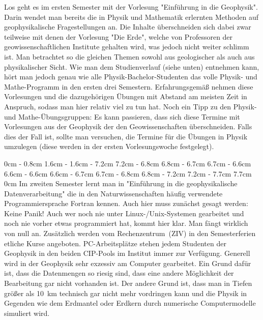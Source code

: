 \begin{multicols}{2}
Los geht es im ersten Semester mit der Vorlesung "Einführung in die Geophysik". Darin wendet man bereits die in Physik und Mathematik erlernten Methoden auf geophysikalische Fragestellungen an. Die Inhalte überschneiden sich dabei zwar teilweise mit denen der Vorlesung "Die Erde", welche von Professoren der geowissenschaftlichen Institute gehalten wird, was jedoch nicht weiter schlimm ist. Man betrachtet so die gleichen Themen sowohl aus geologischer als auch aus physikalischer Sicht. Wie man dem Studienverlauf (siehe unten) entnehmen kann, hört man jedoch genau wie alle Physik-Bachelor-Studenten das volle Physik- und Mathe-Programm in den ersten drei Semestern. Erfahrungsgemäß nehmen diese Vorlesungen und die dazugehörigen Übungen mit Abstand am meisten Zeit in Anspruch, sodass man hier relativ viel zu tun hat. Noch ein Tipp zu den Physik- und Mathe-Übungsgruppen: Es kann passieren, dass sich diese Termine mit Vorlesungen aus der Geophysik der den Geowissenschaften überschneiden. Falls dies der Fall ist, sollte man versuchen, die Termine für die Übungen in Physik umzulegen (diese werden in der ersten Vorlesungswoche festgelegt).

0cm \columnwidth
0cm \columnwidth
0cm \columnwidth
0cm \columnwidth
0cm \columnwidth
0cm \columnwidth
0cm \columnwidth
0cm \columnwidth
0cm \columnwidth
0cm \columnwidth
0cm \columnwidth
0cm \columnwidth
0cm \columnwidth
0.8cm \dimexpr\columnwidth - 0.8cm
1.6cm \dimexpr\columnwidth - 1.6cm
\dimexpr\columnwidth - 7.2cm 7.2cm
\dimexpr\columnwidth - 6.8cm 6.8cm
\dimexpr\columnwidth - 6.7cm 6.7cm
\dimexpr\columnwidth - 6.6cm 6.6cm
\dimexpr\columnwidth - 6.6cm 6.6cm
\dimexpr\columnwidth - 6.7cm 6.7cm
\dimexpr\columnwidth - 6.8cm 6.8cm
\dimexpr\columnwidth - 7.2cm 7.2cm
\dimexpr\columnwidth - 7.7cm 7.7cm
0cm \columnwidth
Im zweiten Semester lernt man in "Einführung in die geophysikalische Datenverarbeitung" die in den Naturwissenschaften häufig verwendete Programmiersprache Fortran kennen. Auch hier muss zunächst gesagt werden: Keine Panik! Auch wer noch nie unter Linux-/Unix-Systemen gearbeitet und noch nie vorher etwas programmiert hat, kommt hier klar. Man fängt wirklich von null an. Zusätzlich werden vom Rechenzentrum~(ZIV) in den Semesterferien etliche Kurse angeboten. PC-Arbeitsplätze stehen jedem Studenten der Geophysik in den beiden CIP-Pools im Institut immer zur Verfügung. Generell wird in der Geophysik sehr exzessiv am Computer gearbeitet. Ein Grund dafür ist, dass die Datenmengen so riesig sind, dass eine andere Möglichkeit der Bearbeitung gar nicht vorhanden ist. Der andere Grund ist, dass man in Tiefen größer als \SI{10}{\km} technisch gar nicht mehr vordringen kann und die Physik in Gegenden wie dem Erdmantel oder Erdkern durch numerische Computermodelle simuliert wird.


\end{multicols}
